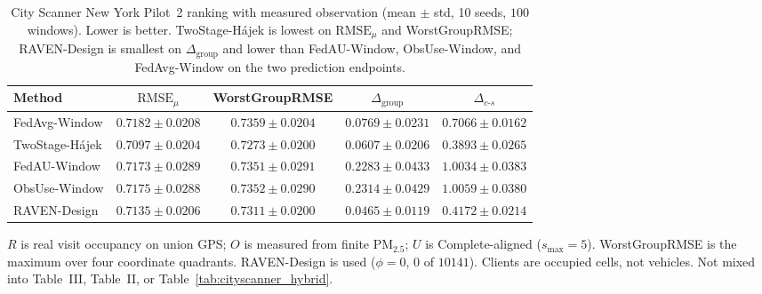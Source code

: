 \begin{table}[t]
\centering
\caption{City Scanner New York Pilot~2 ranking with measured observation
(mean $\pm$ std, 10 seeds, $100$ windows).  Lower is better.
TwoStage-H\'ajek is lowest on $\mathrm{RMSE}_{\mu}$ and WorstGroupRMSE;
RAVEN-Design is smallest on $\Delta_{\mathrm{group}}$ and
lower than FedAU-Window, ObsUse-Window, and FedAvg-Window on the two prediction
endpoints.}
\label{tab:cityscanner_p2_measured_o}
\scriptsize
\setlength{\tabcolsep}{2.5pt}
\begin{tabular}{@{}lcccc@{}}
\toprule
Method & $\mathrm{RMSE}_{\mu}$ & WorstGroupRMSE &
$\Delta_{\mathrm{group}}$ & $\Delta_{c\text{-}s}$\\
\midrule
FedAvg-Window & $0.7182{\pm}0.0208$ & $0.7359{\pm}0.0204$ & $0.0769{\pm}0.0231$ & $0.7066{\pm}0.0162$\\
TwoStage-H\'ajek & $\mathbf{0.7097}{\pm}0.0204$ & $\mathbf{0.7273}{\pm}0.0200$ & $0.0607{\pm}0.0206$ & $\mathbf{0.3893}{\pm}0.0265$\\
FedAU-Window & $0.7173{\pm}0.0289$ & $0.7351{\pm}0.0291$ & $0.2283{\pm}0.0433$ & $1.0034{\pm}0.0383$\\
ObsUse-Window & $0.7175{\pm}0.0288$ & $0.7352{\pm}0.0290$ & $0.2314{\pm}0.0429$ & $1.0059{\pm}0.0380$\\
RAVEN-Design & $0.7135{\pm}0.0206$ & $0.7311{\pm}0.0200$ & $\mathbf{0.0465}{\pm}0.0119$ & $0.4172{\pm}0.0214$\\
\bottomrule
\end{tabular}

\begin{minipage}{\columnwidth}
\raggedright\scriptsize
$R$ is real visit occupancy on union GPS; $O$ is measured from finite
{PM}$_{2.5}$; $U$ is Complete-aligned ($s_{\max}=5$).
WorstGroupRMSE is the maximum over four coordinate quadrants.
RAVEN-Design is used ($\phi=0$, $0$ of $10141$).
Clients are occupied cells, not vehicles.
Not mixed into Table~III,
Table~II, or Table~\ref{tab:cityscanner_hybrid}.
\end{minipage}
\end{table}


